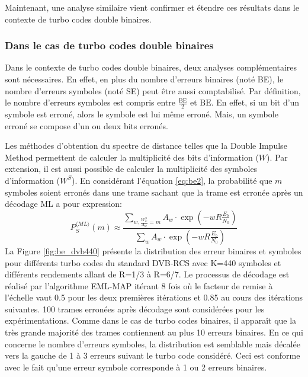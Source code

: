 Maintenant, une analyse similaire vient confirmer et étendre ces résultats dans le contexte de turbo codes double binaires.

\subsubsection{Dans le cas de turbo codes double binaires}
Dans le contexte de turbo codes double binaires, deux analyses complémentaires sont nécessaires. En effet, en plus du 
nombre d'erreurs binaires (noté BE), le nombre d'erreurs symboles (noté SE) peut être aussi comptabilisé. Par définition, 
le nombre d'erreurs symboles est compris entre $\frac{\text{BE}}{2} $ et $\text{BE}$. En effet, si un bit d'un symbole 
est erroné, alors le symbole est lui même erroné. Mais, un symbole erroné se compose d'un ou deux bits erronés.

Les méthodes d'obtention du spectre de distance telles que la Double Impulse Method permettent de calculer la multiplicité 
des bits d'information ($W$). Par extension, il est aussi possible de calculer la multiplicité des symboles d'information
($W^S$). En considérant l'équation \ref{eq:be2}, la probabilité que $m$ symboles soient erronés dans une trame sachant 
que la trame est erronée après un décodage ML a pour expression: 
\begin{equation}
P_S^{\langle ML\rangle}(m) \approx \frac{\displaystyle\sum\limits_{w, \frac{W^S_w}{A_w}=m} A_w\cdot \exp\left(-w R \frac{E_b}{N_0}\right)}
                  {\displaystyle\sum\limits_{w} A_w\cdot \exp\left(-w R \frac{E_b}{N_0}\right)}
\label{eq:se}
\end{equation}
La Figure \ref{fig:be_dvb440} présente la distribution des erreur binaires et symboles pour différents turbo codes du 
standard DVB-RCS avec K=440 symboles et différents rendements allant de R=1/3 à R=6/7. Le processus de décodage est réalisé par
l'algorithme EML-MAP itérant 8 fois où le facteur de remise à l'échelle vaut 0.5 pour les deux premières itérations et 0.85 
au cours des itérations suivantes. 100 trames erronées après décodage sont considérées pour les expérimentations. Comme 
dans le cas de turbo codes 
binaires, il apparaît que la très grande majorité des trames contiennent au plus 10 erreurs binaires. En ce qui concerne 
le nombre d'erreurs symboles, la distribution est semblable mais décalée vers la gauche de 1 à 3 erreurs suivant le turbo 
code considéré. Ceci est conforme avec le fait qu'une erreur symbole corresponde à 1 ou 2 erreurs binaires. 

